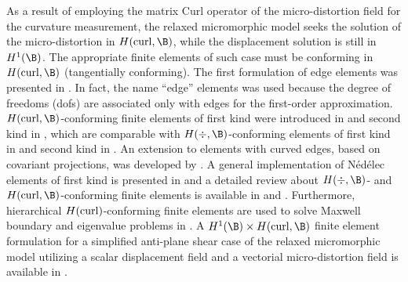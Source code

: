 As a result of employing the matrix Curl operator of the micro-distortion field for the curvature measurement, the relaxed micromorphic model seeks the solution of the micro-distortion in $H(\curl,\B)$, while the displacement solution is still in $H^1(\B)$.  The appropriate finite elements of such case must be conforming in $H(\curl,\B)$  (tangentially conforming). The first formulation of edge elements was presented in \cite{RavTho:1977:amf}. In fact, the name ``edge'' elements was used because the degree of freedoms (dofs) are associated only with edges for the first-order approximation. $H(\curl,\B)$-conforming finite elements of  first kind were introduced in \cite{Ned:1980:mfe} and second kind in \cite{Ned:1986:anf}, which are comparable with $H(\div,\B)$-conforming  elements of first kind in \cite{RavTho:1977:amf} and second kind in \cite{BreDouMar:1984:tfo}. An extension to elements with curved edges, based on covariant projections, was developed by \cite{CroSilHur:1988:cpe}. A general implementation of  N\'ed\'elec elements of  first kind is presented in \cite{OlmBadMAr:2019:oag} and a detailed review about $H(\div,\B)$- and $H(\curl,\B)$-conforming finite elements is available in \cite{KirLogRogTer:2012:cau} and \cite{RogKirAnd:2009:eao}.  Furthermore, hierarchical $H(\operatorname{curl})$-conforming finite elements are used to solve Maxwell boundary and eigenvalue problems in \cite{schzag:2005:hon}. A  $H^1(\B) \times H(\curl,\B)$ finite element formulation for a simplified anti-plane shear case of the relaxed micromorphic model utilizing a scalar displacement field and a vectorial micro-distortion field is available in \cite{SkyNeuMueSchNef:2021:CM}.

